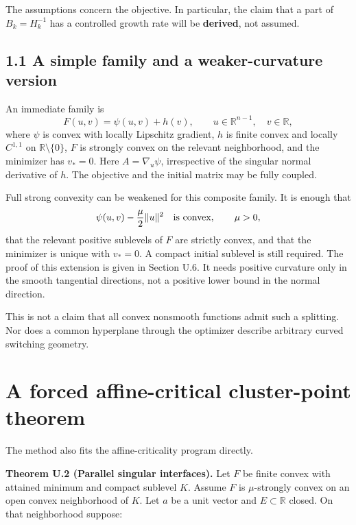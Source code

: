 \documentclass[10pt,oneside,openany]{book}
\theoremstyle{remark}\newtheorem{remark}{Remark}[chapter]
\begin{document}
The assumptions concern the objective. In particular, the claim that a
part of \(B_k=H_k^{-1}\) has a controlled growth rate will be
\textbf{derived}, not assumed.

\subsection{1.1 A simple family and a weaker-curvature
version}\label{U:a-simple-family-and-a-weaker-curvature-version}

An immediate family is \[
 \boxed{F(u,v)=\psi(u,v)+h(v),\qquad u\in\mathbb R^{n-1},\quad v\in\mathbb R,}
\] where \(\psi\) is convex with locally Lipschitz gradient, \(h\) is
finite convex and locally \(C^{1,1}\) on \(\mathbb R\setminus\{0\}\),
\(F\) is strongly convex on the relevant neighborhood, and the minimizer
has \(v_*=0\). Here \(A=\nabla_u\psi\), irrespective of the singular
normal derivative of \(h\). The objective and the initial matrix may be
fully coupled.

Full strong convexity can be weakened for this composite family. It is
enough that \[
 \psi(u,v)-\frac{\mu}{2}\|u\|^2\quad\hbox{is convex},\qquad \mu>0,
\] that the relevant positive sublevels of \(F\) are strictly convex,
and that the minimizer is unique with \(v_*=0\). A compact initial
sublevel is still required. The proof of this extension is given in
Section U.6. It needs positive curvature only in the smooth tangential
directions, not a positive lower bound in the normal direction.

This is not a claim that all convex nonsmooth functions admit such a
splitting. Nor does a common hyperplane through the optimizer describe
arbitrary curved switching geometry.


\setcounter{section}{1}
\setcounter{theorem}{0}
\setcounter{lemma}{0}
\setcounter{corollary}{0}
\setcounter{proposition}{0}
\setcounter{remark}{0}
\setcounter{equation}{0}
\section{A forced affine-critical cluster-point
theorem}\label{U:a-forced-affine-critical-cluster-point-theorem}

The method also fits the affine-criticality program directly.

\label{U:parallel}\textbf{Theorem U.2 (Parallel singular interfaces).} Let \(F\) be finite
convex with attained minimum and compact sublevel \(K\). Assume \(F\) is
\(\mu\)-strongly convex on an open convex neighborhood of \(K\). Let
\(a\) be a unit vector and \(E\subset\mathbb R\) closed. On that
neighborhood suppose:
\end{document}
